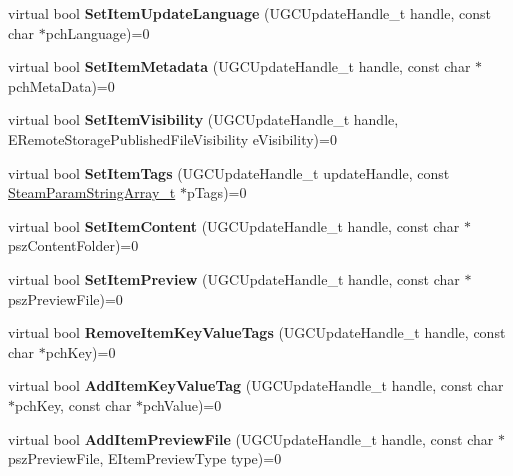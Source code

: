 \begin{DoxyCompactItemize}
virtual bool {\bfseries Set\+Item\+Update\+Language} (U\+G\+C\+Update\+Handle\+\_\+t handle, const char $\ast$pch\+Language)=0
\item 
\mbox{\label{class_i_steam_u_g_c_ae82eb81e46d10ee16600eb013af3d55c}} 
virtual bool {\bfseries Set\+Item\+Metadata} (U\+G\+C\+Update\+Handle\+\_\+t handle, const char $\ast$pch\+Meta\+Data)=0
\item 
\mbox{\label{class_i_steam_u_g_c_ad65383e36e6edf374e55273b2740d69b}} 
virtual bool {\bfseries Set\+Item\+Visibility} (U\+G\+C\+Update\+Handle\+\_\+t handle, E\+Remote\+Storage\+Published\+File\+Visibility e\+Visibility)=0
\item 
\mbox{\label{class_i_steam_u_g_c_af98a34b764aba2d012d9274edfda6af2}} 
virtual bool {\bfseries Set\+Item\+Tags} (U\+G\+C\+Update\+Handle\+\_\+t update\+Handle, const \hyperlink{struct_steam_param_string_array__t}{Steam\+Param\+String\+Array\+\_\+t} $\ast$p\+Tags)=0
\item 
\mbox{\label{class_i_steam_u_g_c_a50d65b55db7f4760117c23758c235bed}} 
virtual bool {\bfseries Set\+Item\+Content} (U\+G\+C\+Update\+Handle\+\_\+t handle, const char $\ast$psz\+Content\+Folder)=0
\item 
\mbox{\label{class_i_steam_u_g_c_a316f5f47e820ae4ec8fd2746e42f9f53}} 
virtual bool {\bfseries Set\+Item\+Preview} (U\+G\+C\+Update\+Handle\+\_\+t handle, const char $\ast$psz\+Preview\+File)=0
\item 
\mbox{\label{class_i_steam_u_g_c_a59f019cc186039c09fc1a3505d9444bf}} 
virtual bool {\bfseries Remove\+Item\+Key\+Value\+Tags} (U\+G\+C\+Update\+Handle\+\_\+t handle, const char $\ast$pch\+Key)=0
\item 
\mbox{\label{class_i_steam_u_g_c_aec583220da9bc8e2465daaa5e5ec372b}} 
virtual bool {\bfseries Add\+Item\+Key\+Value\+Tag} (U\+G\+C\+Update\+Handle\+\_\+t handle, const char $\ast$pch\+Key, const char $\ast$pch\+Value)=0
\item 
\mbox{\label{class_i_steam_u_g_c_a46f30e99092f9071cf4efe54fa21a360}} 
virtual bool {\bfseries Add\+Item\+Preview\+File} (U\+G\+C\+Update\+Handle\+\_\+t handle, const char $\ast$psz\+Preview\+File, E\+Item\+Preview\+Type type)=0

\end{DoxyCompactItemize}
